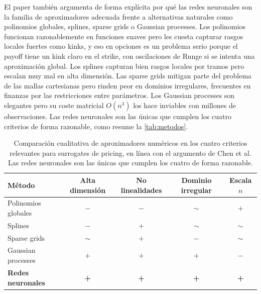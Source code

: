 \documentclass[11pt,a4paper]{article}
\begin{document}
El paper también argumenta de forma explícita por qué las redes neuronales son la familia de aproximadores adecuada frente a alternativas naturales como polinomios globales, splines, sparse grids o Gaussian processes. Los polinomios funcionan razonablemente en funciones suaves pero les cuesta capturar rasgos locales fuertes como kinks, y eso en opciones es un problema serio porque el payoff tiene un kink claro en el strike, con oscilaciones de Runge si se intenta una aproximación global. Los splines capturan bien rasgos locales por tramos pero escalan muy mal en alta dimensión. Las sparse grids mitigan parte del problema de las mallas cartesianas pero rinden peor en dominios irregulares, frecuentes en finanzas por las restricciones entre parámetros. Los Gaussian processes son elegantes pero su coste matricial $O(n^3)$ los hace inviables con millones de observaciones. Las redes neuronales son las únicas que cumplen los cuatro criterios de forma razonable, como resume la \autoref{tab:metodos}.

\begin{table}[ht]
\centering
\small
\begin{tabular}{lcccc}
\toprule
Método & Alta dimensión & No linealidades & Dominio irregular & Escala $n$ \\
\midrule
Polinomios globales       & \textcolor{paperred}{$-$}       & \textcolor{paperred}{$-$}       & \textcolor{paperorange}{$\sim$} & \textcolor{papergreen}{$+$} \\
Splines            & \textcolor{paperred}{$-$}       & \textcolor{papergreen}{$+$}    & \textcolor{paperorange}{$\sim$} & \textcolor{paperorange}{$\sim$} \\
Sparse grids       & \textcolor{paperorange}{$\sim$} & \textcolor{papergreen}{$+$}    & \textcolor{paperred}{$-$}       & \textcolor{paperorange}{$\sim$} \\
Gaussian processes & \textcolor{papergreen}{$+$}    & \textcolor{papergreen}{$+$}    & \textcolor{papergreen}{$+$}    & \textcolor{paperred}{$-$} \\
\textbf{Redes neuronales} & \textcolor{papergreen}{\textbf{+}} & \textcolor{papergreen}{\textbf{+}} & \textcolor{papergreen}{\textbf{+}} & \textcolor{papergreen}{\textbf{+}} \\
\bottomrule
\end{tabular}
\caption{Comparación cualitativa de aproximadores numéricos en los cuatro criterios relevantes para surrogates de pricing, en línea con el argumento de Chen et al. Las redes neuronales son las únicas que cumplen los cuatro de forma razonable.}
\label{tab:metodos}
\end{table}
\end{document}
